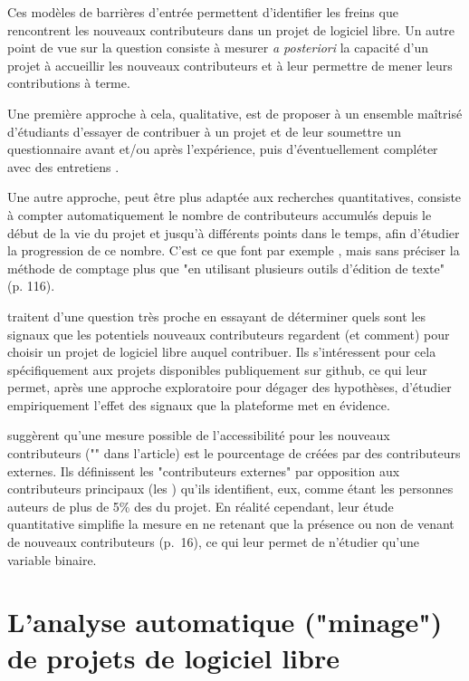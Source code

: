 Ces modèles de barrières d'entrée permettent d'identifier les freins que rencontrent les nouveaux
contributeurs dans un projet de logiciel libre. Un autre point de vue sur la question consiste à mesurer
\emph{a posteriori} la capacité d'un projet à accueillir les nouveaux contributeurs et à leur permettre de
mener leurs contributions à terme.

Une première approche à cela, qualitative, est de proposer à un ensemble maîtrisé d'étudiants d'essayer de
contribuer à un projet et de leur soumettre un questionnaire avant et/ou après l'expérience, puis
d'éventuellement compléter avec des entretiens
\parencites{newcomers-accessibility-2016}{newcomers-onboarding-2018}[voir aussi][]{newcomers-adaptation-2005}.

Une autre approche, peut être plus adaptée aux recherches quantitatives, consiste à compter automatiquement le
nombre de contributeurs accumulés depuis le début de la vie du projet et jusqu'à différents points dans le
temps, afin d'étudier la progression de ce nombre. C'est ce que font par exemple
, mais sans préciser la méthode de comptage plus que "en utilisant
plusieurs outils d'édition de texte" (p. 116).

 traitent d'une question très proche en essayant de déterminer quels sont les
signaux que les potentiels nouveaux contributeurs regardent (et comment) pour choisir un projet de logiciel
libre auquel contribuer. Ils s'intéressent pour cela spécifiquement aux projets disponibles publiquement sur
\gls{github}, ce qui leur permet, après une approche exploratoire pour dégager des hypothèses, d'étudier
empiriquement l'effet des signaux que la plateforme met en évidence.

 suggèrent qu'une mesure possible de l'accessibilité pour les nouveaux
contributeurs ("" dans l'article) est le pourcentage de  créées
par des contributeurs externes. Ils définissent les "contributeurs externes" par opposition aux contributeurs
principaux (les ) qu'ils identifient, eux, comme étant les personnes auteurs de plus de
5\% des  du projet. En réalité cependant, leur étude quantitative simplifie la mesure en ne
retenant que la présence ou non de  venant de nouveaux contributeurs (p.~16), ce qui leur
permet de n'étudier qu'une variable binaire.

\section{L'analyse automatique ("minage") de projets de logiciel libre}

